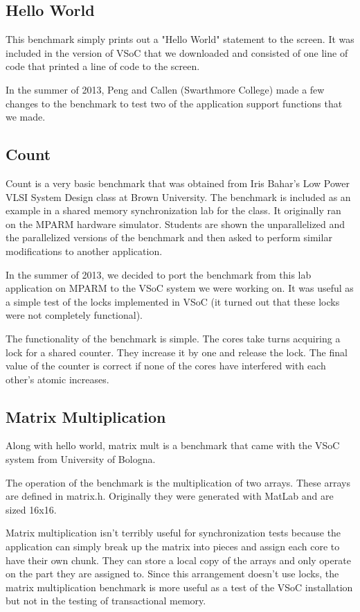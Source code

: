 \documentclass{article}
\begin{document}
\subsection{Hello World}

This benchmark simply prints out a "Hello World" statement to the screen. It 
was included in the version of VSoC that we downloaded and consisted of one 
line of code that printed a line of code to the screen. 

In the summer of 2013, Peng and Callen (Swarthmore College) made a few changes 
to the benchmark to test two of the application support functions that we made. 

\subsection{Count}

Count is a very basic benchmark that was obtained from Iris Bahar's Low Power 
VLSI System Design class at Brown University. The benchmark is included as an 
example in a shared memory synchronization lab for the class. It originally 
ran on the MPARM hardware simulator. Students are shown the unparallelized and 
the parallelized versions of the benchmark and then asked to perform similar 
modifications to another application. 

In the summer of 2013, we decided to port the benchmark from this lab 
application on MPARM to the VSoC system we were working on.  It was useful as 
a simple test of the locks implemented in VSoC (it turned out that these locks 
were not completely functional).

The functionality of the benchmark is simple. The cores take turns acquiring a 
lock for a shared counter. They increase it by one and release the lock. The 
final value of the counter is correct if none of the cores have interfered 
with each other's atomic increases.

\subsection{Matrix Multiplication}

Along with hello world, matrix mult is a benchmark that came with the VSoC 
system from University of Bologna. 

The operation of the benchmark is the multiplication of two arrays. These 
arrays are defined in matrix.h. Originally they were generated with MatLab and 
are sized 16x16. 

Matrix multiplication isn't terribly useful for synchronization tests because 
the application can simply break up the matrix into pieces and assign each 
core to have their own chunk.  They can store a local copy of the arrays and 
only operate on the part they are assigned to. Since this arrangement doesn't 
use locks, the matrix multiplication benchmark is more useful as a test of the 
VSoC installation but not in the testing of transactional memory. 
\end{document}
